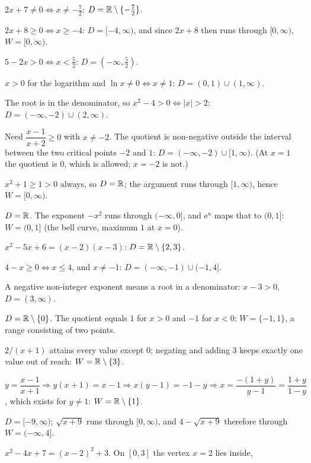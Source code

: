 \begin{solutions}
  \item $2x+7\neq0\iff x\neq-\tfrac{7}{2}$:
        \;$D=\mathbb{R}\setminus\{-\tfrac{7}{2}\}$.
  \item $2x+8\geq0\iff x\geq-4$: \;$D=[-4,\infty)$, and since $2x+8$ then
        runs through $[0,\infty)$, \;$W=[0,\infty)$.
  \item $5-2x>0\iff x<\tfrac{5}{2}$: \;$D=(-\infty,\tfrac{5}{2})$.
  \item $x>0$ for the logarithm and $\ln x\neq0\iff x\neq1$:
        \;$D=(0,1)\cup(1,\infty)$.
  \item The root is in the denominator, so $x^{2}-4>0\iff|x|>2$:
        \;$D=(-\infty,-2)\cup(2,\infty)$.
  \item Need $\dfrac{x-1}{x+2}\geq0$ with $x\neq-2$. The quotient is
        non-negative outside the interval between the two critical points
        $-2$ and $1$: \;$D=(-\infty,-2)\cup[1,\infty)$. (At $x=1$ the
        quotient is $0$, which is allowed; $x=-2$ is not.)
  \item $x^{2}+1\geq1>0$ always, so $D=\mathbb{R}$; the argument runs through
        $[1,\infty)$, hence \;$W=[0,\infty)$.
  \item $D=\mathbb{R}$. The exponent $-x^{2}$ runs through $(-\infty,0]$, and
        $\mathrm{e}^{u}$ maps that to $(0,1]$: \;$W=(0,1]$ (the bell curve,
        maximum $1$ at $x=0$).
  \item $x^{2}-5x+6=(x-2)(x-3)$: \;$D=\mathbb{R}\setminus\{2,3\}$.
  \item $4-x\geq0\iff x\leq4$, and $x\neq-1$:
        \;$D=(-\infty,-1)\cup(-1,4]$.
  \item A negative non-integer exponent means a root in a denominator:
        $x-3>0$, \;$D=(3,\infty)$.
  \item $D=\mathbb{R}\setminus\{0\}$. The quotient equals $1$ for $x>0$ and $-1$
        for $x<0$: \;$W=\{-1,1\}$, a range consisting of two points.
  \item $2/(x+1)$ attains every value except $0$; negating and adding $3$
        keeps exactly one value out of reach: \;$W=\mathbb{R}\setminus\{3\}$.
  \item $y=\dfrac{x-1}{x+1}\Rightarrow y(x+1)=x-1\Rightarrow
        x(y-1)=-1-y\Rightarrow x=\dfrac{-(1+y)}{y-1}=\dfrac{1+y}{1-y}$,
        which exists for $y\neq1$: \;$W=\mathbb{R}\setminus\{1\}$.
  \item $D=[-9,\infty)$; $\sqrt{x+9}$ runs through $[0,\infty)$, and
        $4-\sqrt{x+9}$ therefore through \;$W=(-\infty,4]$.
  \item $x^{2}-4x+7=(x-2)^{2}+3$. On $[0,3]$ the vertex $x=2$ lies inside,

\end{solutions}
